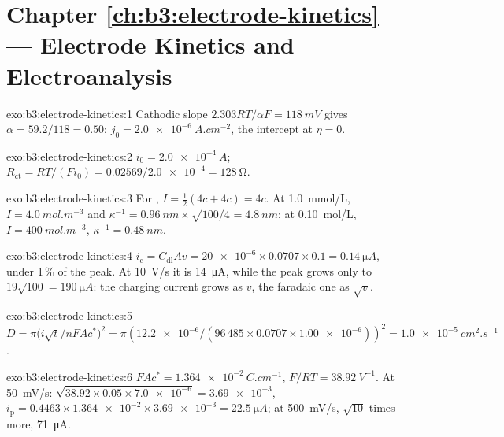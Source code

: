 \section*{Chapter \ref{ch:b3:electrode-kinetics} --- Electrode Kinetics and Electroanalysis}

\begin{solution}{exo:b3:electrode-kinetics:1}
Cathodic slope $2.303RT/\alpha F = \qty{118}{mV}$ gives $\alpha = 59.2/118 = 0.50$; $j_0 = \qty{2.0e-6}{A.cm^{-2}}$,
the intercept at $\eta = 0$.
\end{solution}

\begin{solution}{exo:b3:electrode-kinetics:2}
$i_0 = \qty{2.0e-4}{A}$; $R_{\mathrm{ct}} = RT/(Fi_0) = 0.02569/\num{2.0e-4} = \qty{128}{\ohm}$.
\end{solution}

\begin{solution}{exo:b3:electrode-kinetics:3}
For , $I = \frac12(4c + 4c) = 4c$. At \qty{1.0}{mmol/L}, $I = \qty{4.0}{mol.m^{-3}}$ and $\kappa^{-1} =
\qty{0.96}{nm} \times \sqrt{100/4} = \qty{4.8}{nm}$; at \qty{0.10}{mol/L}, $I = \qty{400}{mol.m^{-3}}$, $\kappa^{-1} = \qty{0.48}{nm}$.
\end{solution}

\begin{solution}{exo:b3:electrode-kinetics:4}
$i_{\mathrm c} = C_{\mathrm{dl}}Av = \num{20e-6} \times 0.0707 \times 0.1 = \qty{0.14}{\micro A}$, under 1\,\% of the peak. At
\qty{10}{V/s} it is \qty{14}{\micro A}, while the peak grows only to $19\sqrt{100} = \qty{190}{\micro A}$:
the charging current grows as $v$, the faradaic one as $\sqrt v$.
\end{solution}

\begin{solution}{exo:b3:electrode-kinetics:5}
$D = \pi\bigl(i\sqrt t/nFAc^*\bigr)^2 = \pi(\num{12.2e-6}/(96\,485 \times 0.0707 \times \num{1.00e-6}))^2 =
\qty{1.0e-5}{cm^2.s^{-1}}$.
\end{solution}

\begin{solution}{exo:b3:electrode-kinetics:6}
$FAc^* = \qty{1.364e-2}{C.cm^{-1}}$, $F/RT = \qty{38.92}{V^{-1}}$. At \qty{50}{mV/s}: $\sqrt{38.92 \times 0.05 \times \num{7.0e-6}} =
\num{3.69e-3}$, $i_{\mathrm p} = 0.4463 \times \num{1.364e-2} \times \num{3.69e-3} = \qty{22.5}{\micro A}$; at \qty{500}{mV/s}, $\sqrt{10}$ times
more, \qty{71}{\micro A}.
\end{solution}

